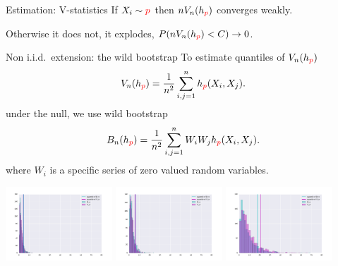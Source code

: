 \begin{frame}
\begin{columns}
\begin{column}{.33\linewidth}
\begin{block}{Estimation: V-statistics}
If $X_i \sim {\color{red} p}$ then $ n V_n(h_{\color{red} p})$  converges weakly. 

Otherwise it does not,  it explodes, $P(n V_n(h_{\color{red} p}) <C) \to 0$.
\end{block}
\vspace{-0.75cm}
\begin{block}{Non i.i.d.\ extension: the wild bootstrap}
To estimate quantiles of $ V_n(h_{\color{red} p})$  
\[
 V_n(h_{\color{red} p}) = \frac {1} {n^2} \sum_{i,j=1}^n h_{\color{red} p}(X_i,X_j).
\]
under the null, we use wild bootstrap
\[
 B_n(h_{\color{red} p}) = \frac {1} {n^2} \sum_{i,j=1}^n W_i W_j h_{\color{red} p}(X_i,X_j).
\]
  where $W_i$ is a specific series of zero valued random variables.


 \includegraphics[width=0.3\textwidth]{./img/bootstrapWorks1.pdf}
 \includegraphics[width=0.3\textwidth]{./img/bootstrapWorks4.pdf}
 \includegraphics[width=0.3\textwidth]{./img/bootstrapWorks8.pdf}
\end{block}
\end{column}



\end{columns}
\end{frame}
